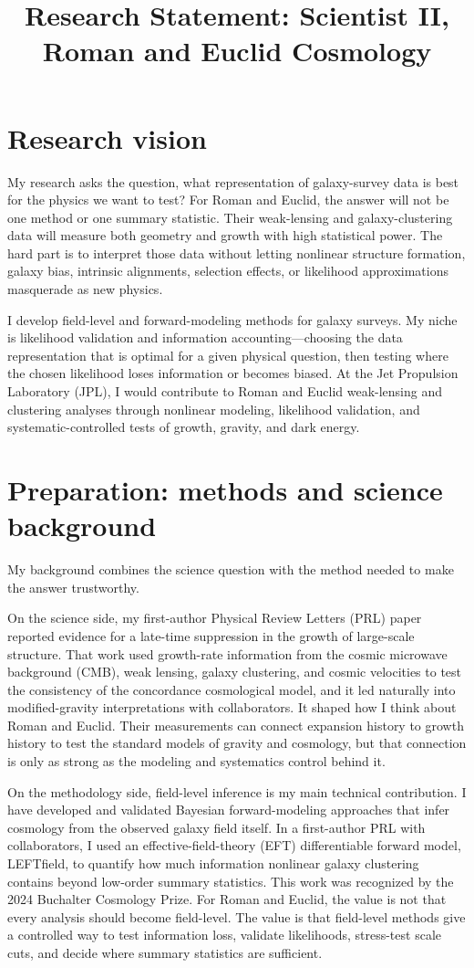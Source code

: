 \documentclass[11pt,letterpaper,sans]{moderncv}
\title{Research Statement: Scientist II, Roman and Euclid Cosmology}
\begin{document}
\makecvtitle
\vspace{-1.2em}

\section{Research vision}
My research asks the question, what representation of galaxy-survey data is best for the physics we want to test? For Roman and Euclid, the answer will not be one method or one summary statistic. Their weak-lensing and galaxy-clustering data will measure both geometry and growth with high statistical power. The hard part is to interpret those data without letting nonlinear structure formation, galaxy bias, intrinsic alignments, selection effects, or likelihood approximations masquerade as new physics.

I develop field-level and forward-modeling methods for galaxy surveys. My niche is likelihood validation and information accounting---choosing the data representation that is optimal for a given physical question, then testing where the chosen likelihood loses information or becomes biased. At the Jet Propulsion Laboratory (JPL), I would contribute to Roman and Euclid weak-lensing and clustering analyses through nonlinear modeling, likelihood validation, and systematic-controlled tests of growth, gravity, and dark energy.

\section{Preparation: methods and science background}
My background combines the science question with the method needed to make the answer trustworthy.

On the science side, my first-author Physical Review Letters (PRL) paper reported evidence for a late-time suppression in the growth of large-scale structure. That work used growth-rate information from the cosmic microwave background (CMB), weak lensing, galaxy clustering, and cosmic velocities to test the consistency of the concordance cosmological model, and it led naturally into modified-gravity interpretations with collaborators. It shaped how I think about Roman and Euclid. Their measurements can connect expansion history to growth history to test the standard models of gravity and cosmology, but that connection is only as strong as the modeling and systematics control behind it.

On the methodology side, field-level inference is my main technical contribution. I have developed and validated Bayesian forward-modeling approaches that infer cosmology from the observed galaxy field itself. In a first-author PRL with collaborators, I used an effective-field-theory (EFT) differentiable forward model, LEFTfield, to quantify how much information nonlinear galaxy clustering contains beyond low-order summary statistics. This work was recognized by the 2024 Buchalter Cosmology Prize. For Roman and Euclid, the value is not that every analysis should become field-level. The value is that field-level methods give a controlled way to test information loss, validate likelihoods, stress-test scale cuts, and decide where summary statistics are sufficient.
\end{document}
